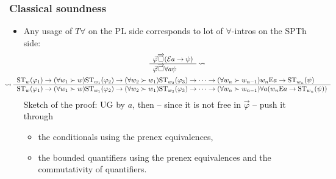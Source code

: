 \documentclass[xcolor=x11names]{beamer}
\newcommand{\past}{\succ}
\newcommand{\lrule}[3][c]{\begin{array}{#1} #2  \\  \hline #3 \end{array}}
\newcommand{\lthen}{\rightarrow}
\newcommand{\forallp}[1]{(\forall #1)}
\newcommand{\Ex}{\mathrm{E}}
\newcommand{\BoxTemplate}[1]{{#1} \overrightarrow {\Box}}
\begin{document}
\begin{frame}[t]
\frametitle{Classical soundness}
\footnotesize
\begin{itemize}
\item Any usage of $T\forall$ on the PL side corresponds to lot of $\forall$-intros on the SPTh side:
{ \tiny\begin{multline*}
 \lrule[l]{ \BoxTemplate{\vec\varphi } (\mathcal E a\lthen \psi)}{\BoxTemplate{\vec\varphi }\forall a \psi }
 \rightsquigarrow
 \\ \hspace{-1cm}\rightsquigarrow
 \lrule[l]
 {\mathrm{ST}_{w}(\varphi_1) \lthen \forallp{w_1\past w} \mathrm{ST}_{w_1}(\varphi_2) \lthen \forallp{w_2\past w_1} \mathrm{ST}_{w_2}(\varphi_3) \lthen \dots\lthen \forallp{w_n\past w_{n-1}} w_n \Ex a \lthen \mathrm{ST}_{w_n}(\psi)}
 {\mathrm{ST}_{w}(\varphi_1) \lthen \forallp{w_1\past w} \mathrm{ST}_{w_1}(\varphi_2) \lthen \forallp{w_2\past w_1} \mathrm{ST}_{w_2}(\varphi_3) \lthen \dots \lthen \forallp{w_n\past w_{n-1}} \forall a (w_n \Ex a \lthen \mathrm{ST}_{w_n}(\psi))}\end{multline*}}
Sketch of the proof: UG by $a$, then -- since it is not free in $\vec \varphi$ -- push it through
\begin{itemize}
\item the conditionals using the prenex equivalences,
\item the bounded quantifiers using the prenex equivalences and the commutativity of quantifiers.
\end{itemize}
\end{itemize}
\end{frame}
\end{document}
